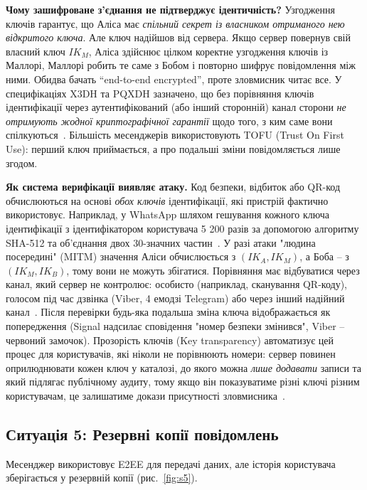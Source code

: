 \textbf{Чому зашифроване з’єднання не підтверджує ідентичність?} Узгодження ключів гарантує, що Аліса має 
\emph{спільний секрет із власником отриманого нею відкритого ключа}. Але ключ надійшов від сервера. Якщо сервер 
повернув свій власний ключ $IK_M$, Аліса здійснює цілком коректне узгодження ключів із Маллорі, Маллорі робить 
те саме з Бобом і повторно шифрує повідомлення між ними. Обидва бачать \enquote{end-to-end encrypted}, проте 
зловмисник читає все. У специфікаціях X3DH та PQXDH зазначено, що без порівняння ключів ідентифікації через 
аутентифікований (або інший сторонній) канал сторони \emph{не отримують жодної криптографічної гарантії} щодо 
того, з ким саме вони спілкуються~\cite{signal_x3dh, signal_pqxdh}. Більшість месенджерів використовують 
TOFU (Trust On First Use): перший ключ приймається, а про подальші зміни повідомляється лише згодом.

\textbf{Як система верифікації виявляє атаку.} Код безпеки, відбиток або QR-код обчислюються на основі \emph{обох
ключів} ідентифікації, які пристрій фактично використовує. Наприклад, у WhatsApp шляхом гешування кожного ключа 
ідентифікації з ідентифікатором користувача 5 200 разів за допомогою алгоритму SHA-512 та об’єднання двох 30-значних 
частин~\cite{whatsapp_whitepaper}. У разі атаки "людина посередині"{} (MITM) значення Аліси обчислюється з $(IK_A, IK_M)$, 
а Боба -- з $(IK_M, IK_B)$, тому вони не можуть збігатися. Порівняння має відбуватися через канал, який сервер не 
контролює: особисто (наприклад, сканування QR-коду), голосом під час дзвінка (Viber, 4 емодзі Telegram) або через 
інший надійний канал~\cite{signal_safety_number, viber_overview, telegram_techfaq}. Після перевірки будь-яка подальша 
зміна ключа відображається як попередження (Signal надсилає сповідення "номер безпеки змінився"{}, Viber -- червоний 
замочок). Прозорість ключів (Key transparency) автоматизує цей процес для користувачів, які ніколи не порівнюють номери: 
сервер повинен оприлюднювати кожен ключ у каталозі, до якого можна \textit{лише додавати} записи та який підлягає 
публічному аудиту, тому якщо він показуватиме різні ключі різним користувачам, це залишатиме докази присутності 
зловмисника~\cite{whatsapp_key_transparency, signal_akv}.

\subsection{Ситуація 5: Резервні копії повідомлень}
\label{sec:s5}

Месенджер використовує E2EE для передачі даних, але історія користувача зберігається у резервній копії (рис.~\ref{fig:s5}).

